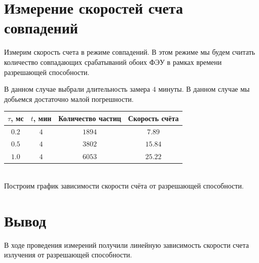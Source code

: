 \documentclass[12pt]{article}
\begin{document}
  \section{Измерение скоростей счета совпадений}

    Измерим скорость счета в режиме совпадений. В этом режиме мы будем считать
    количество совпадающих срабатываний обоих ФЭУ в рамках времени разрешающей
    способности.

    В данном случае выбрали длительность замера $4$ минуты. В данном случае мы
    добьемся достаточно малой погрешности. \\

    \begin{tabular}{ || c || c | c | c ||}
      \hline
      $\tau$, мс & $t$, мин & Количество частиц & Скорость счёта \\ \hline
      $0.2$ & $4$ & $1894$ & $7.89$ \\
      $0.5$ & $4$ & $3802$ & $15.84$ \\
      $1.0$ & $4$ & $6053$ & $25.22$ \\
      \hline
    \end{tabular} \\

    Построим график зависимости скорости счёта от разрешающей способности.

    \begin{figure}[h!]
      \begin{minipage}[h]{0.6\linewidth}
      \end{minipage}
      \label{plot}
    \end{figure}

  \section{Вывод}

    В ходе проведения измерений получили линейную зависимость скорости счета
    излучения от разрешающей способности.
\end{document}
